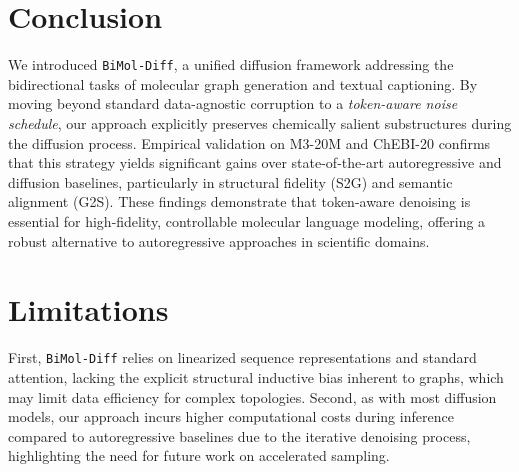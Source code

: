 \section{Conclusion} \label{conclusion}
\vspace{-1mm}
We introduced \texttt{BiMol-Diff}, a unified diffusion framework addressing the bidirectional tasks of molecular graph generation and textual captioning. By moving beyond standard data-agnostic corruption to a \textit{token-aware noise schedule}, our approach explicitly preserves chemically salient substructures during the diffusion process. Empirical validation on M3-20M and ChEBI-20 confirms that this strategy yields significant gains over state-of-the-art autoregressive and diffusion baselines, particularly in structural fidelity (S2G) and semantic alignment (G2S). These findings demonstrate that token-aware denoising is essential for high-fidelity, controllable molecular language modeling, offering a robust alternative to autoregressive approaches in scientific domains.

\section{Limitations}
First, \texttt{BiMol-Diff} relies on linearized sequence representations and standard attention, lacking the explicit structural inductive bias inherent to graphs, which may limit data efficiency for complex topologies. Second, as with most diffusion models, our approach incurs higher computational costs during inference compared to autoregressive baselines due to the iterative denoising process, highlighting the need for future work on accelerated sampling.